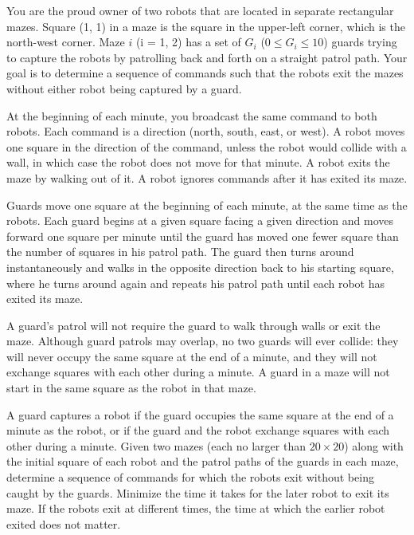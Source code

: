 You are the proud owner of two robots that are located in separate rectangular mazes. Square (1, 1) in a maze is the square in the upper-left corner, which is the north-west corner. Maze $i$ (i = 1, 2) has a set of $G_i$ ($0 \leq G_i \leq 10$) guards trying to capture the robots by patrolling back and forth on a straight patrol path. Your goal is to determine a sequence of commands such that the robots exit the mazes without either robot being captured by a guard.

At the beginning of each minute, you broadcast the same command to both robots. Each command is a direction (north, south, east, or west). A robot moves one square in the direction of the command, unless the robot would collide with a wall, in which case the robot does not move for that minute. A robot exits the maze by walking out of it. A robot ignores commands after it has exited its maze.

Guards move one square at the beginning of each minute, at the same time as the robots. Each guard begins at a given square facing a given direction and moves forward one square per minute until the guard has moved one fewer square than the number of squares in his patrol path. The guard then turns around instantaneously and walks in the opposite direction back to his starting square, where he turns around again and repeats his patrol path until each robot has exited its maze.

A guard's patrol will not require the guard to walk through walls or exit the maze. Although guard patrols may overlap, no two guards will ever collide: they will never occupy the same square at the end of a minute, and they will not exchange squares with each other during a minute. A guard in a maze will not start in the same square as the
robot in that maze.

A guard captures a robot if the guard occupies the same square at the end of a minute as the robot, or if the guard and the robot exchange squares with each other during a minute. Given two mazes (each no larger than $20\times 20$) along with the initial square of each robot and the patrol paths of the guards in each maze, determine a sequence of commands for which the robots exit without being caught by the guards. Minimize the time it takes for the later robot to exit its maze. If the robots exit at different times, the time at which the earlier robot exited does not matter.